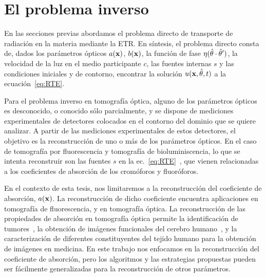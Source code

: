 \chapter{El problema inverso}
\lhead{\thepage}
\vspace{0.01\textheight}
\label{sec:inverso}
\pagebreak

En las secciones previas abordamos el problema directo de transporte 
de radiación en la materia mediante la ETR. En síntesis, el problema 
directo consta de, dados los parámetros ópticos $a(\mathbf{x})$, $b(\mathbf{x})$, la función  
de fase $\eta(\hat{\theta}\cdot \hat{\theta}')$, la velocidad de la luz en el medio participante 
$c$, las fuentes internas $s$ y las condiciones iniciales y de contorno, 
encontrar la solución $u(\mathbf{x},\hat{\theta},t)$ a la ecuación~\eqref{eq:RTE}.

Para el problema inverso en tomografía óptica, alguno de los parámetros 
ópticos es desconocido, 
o conocido sólo parcialmente, y se dispone de mediciones experimentales 
de detectores colocados en el contorno del dominio que se quiere analizar. 
A partir de las mediciones experimentales de estos detectores, 
el objetivo es la reconstrucción de uno o más de los parámetros ópticos. 
En el caso de tomografía por fluorescencia y tomografía de bioluminiscencia, lo que se intenta reconstruir 
son las fuentes $s$ en la ec.~\eqref{eq:RTE}~\cite{Klose2005,Klose2009,Ren2010}, 
que vienen relacionadas a los coeficientes de absorción de los 
cromóforos y fluoróforos. 

En el contexto de esta tesis, nos limitaremos a la reconstrucción del 
coeficiente de absorción, $a(\mathbf{x})$. La reconstrucción de dicho coeficiente 
encuentra aplicaciones en tomografía de fluorescencia, y en tomografía óptica. 
La reconstrucción de las propiedades de absorción en tomografía óptica 
 permite la identificación de tumores~\cite{Zhu2005,Zhu2010,Fujii2016b}, 
la obtención de imágenes funcionales del cerebro humano~\cite{Boas2001,bluestone2001,Arridge1999}, 
y la caracterización de diferentes constituyentes del tejido 
humano para la obtención de imágenes en medicina. En 
este trabajo nos enfocamos en la reconstrucción del coeficiente 
de absorción, pero los algoritmos y las estrategias propuestas 
pueden ser fácilmente generalizadas para la reconstrucción 
de otros parámetros. 

